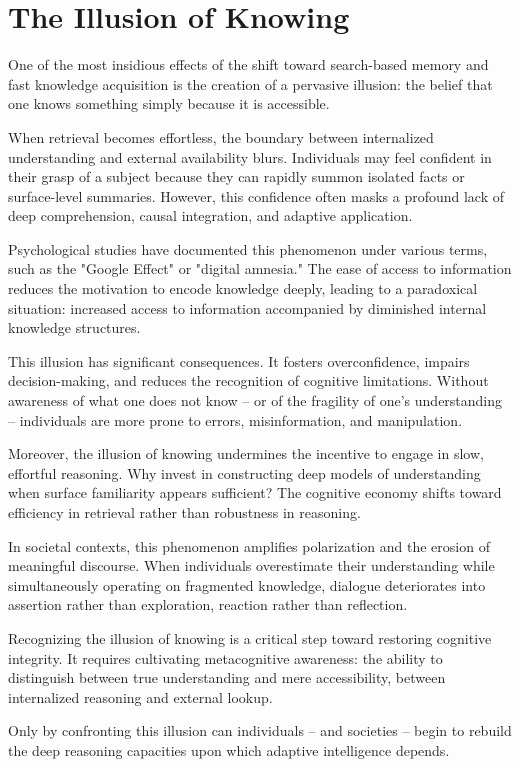 \section{The Illusion of Knowing}

One of the most insidious effects of the shift toward search-based
memory and fast knowledge acquisition is the creation of a pervasive
illusion: the belief that one knows something simply because it is
accessible.

When retrieval becomes effortless, the boundary between internalized
understanding and external availability blurs. Individuals may feel
confident in their grasp of a subject because they can rapidly summon
isolated facts or surface-level summaries. However, this confidence
often masks a profound lack of deep comprehension, causal integration,
and adaptive application.

Psychological studies have documented this phenomenon under various
terms, such as the "Google Effect" or "digital amnesia." The ease of
access to information reduces the motivation to encode knowledge deeply,
leading to a paradoxical situation: increased access to information
accompanied by diminished internal knowledge structures.

This illusion has significant consequences. It fosters overconfidence,
impairs decision-making, and reduces the recognition of cognitive
limitations. Without awareness of what one does not know -- or of the
fragility of one's understanding -- individuals are more prone to errors,
misinformation, and manipulation.

Moreover, the illusion of knowing undermines the incentive to engage in
slow, effortful reasoning. Why invest in constructing deep models of
understanding when surface familiarity appears sufficient? The cognitive
economy shifts toward efficiency in retrieval rather than robustness in
reasoning.

In societal contexts, this phenomenon amplifies polarization and the
erosion of meaningful discourse. When individuals overestimate their
understanding while simultaneously operating on fragmented knowledge,
dialogue deteriorates into assertion rather than exploration, reaction
rather than reflection.

Recognizing the illusion of knowing is a critical step toward restoring
cognitive integrity. It requires cultivating metacognitive awareness:
the ability to distinguish between true understanding and mere
accessibility, between internalized reasoning and external lookup.

Only by confronting this illusion can individuals -- and societies --
begin to rebuild the deep reasoning capacities upon which adaptive
intelligence depends.

